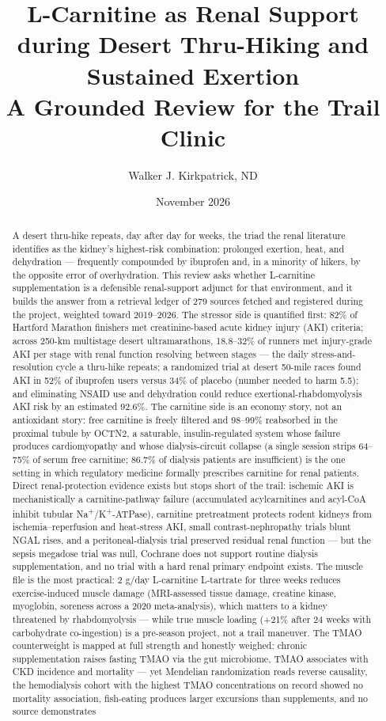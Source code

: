 \documentclass[11pt]{article}
\title{\Large \textbf{L-Carnitine as Renal Support during Desert Thru-Hiking and Sustained Exertion \\ A Grounded Review for the Trail Clinic}}
\author{\normalsize Walker J. Kirkpatrick, ND}
\date{\normalsize November 2026}
\begin{document}
\maketitle

\begin{abstract}
\noindent
A desert thru-hike repeats, day after day for weeks, the triad the renal literature identifies as the kidney's highest-risk combination: prolonged exertion, heat, and dehydration --- frequently compounded by ibuprofen and, in a minority of hikers, by the opposite error of overhydration. This review asks whether L-carnitine supplementation is a defensible renal-support adjunct for that environment, and it builds the answer from a retrieval ledger of 279 sources fetched and registered during the project, weighted toward 2019--2026. The stressor side is quantified first: 82\% of Hartford Marathon finishers met creatinine-based acute kidney injury (AKI) criteria; across 250-km multistage desert ultramarathons, 18.8--32\% of runners met injury-grade AKI per stage with renal function resolving between stages --- the daily stress-and-resolution cycle a thru-hike repeats; a randomized trial at desert 50-mile races found AKI in 52\% of ibuprofen users versus 34\% of placebo (number needed to harm 5.5); and eliminating NSAID use and dehydration could reduce exertional-rhabdomyolysis AKI risk by an estimated 92.6\%. The carnitine side is an economy story, not an antioxidant story: free carnitine is freely filtered and 98--99\% reabsorbed in the proximal tubule by OCTN2, a saturable, insulin-regulated system whose failure produces cardiomyopathy and whose dialysis-circuit collapse (a single session strips 64--75\% of serum free carnitine; 86.7\% of dialysis patients are insufficient) is the one setting in which regulatory medicine formally prescribes carnitine for renal patients. Direct renal-protection evidence exists but stops short of the trail: ischemic AKI is mechanistically a carnitine-pathway failure (accumulated acylcarnitines and acyl-CoA inhibit tubular Na\textsuperscript{+}/K\textsuperscript{+}-ATPase), carnitine pretreatment protects rodent kidneys from ischemia--reperfusion and heat-stress AKI, small contrast-nephropathy trials blunt NGAL rises, and a peritoneal-dialysis trial preserved residual renal function --- but the sepsis megadose trial was null, Cochrane does not support routine dialysis supplementation, and no trial with a hard renal primary endpoint exists. The muscle file is the most practical: 2 g/day L-carnitine L-tartrate for three weeks reduces exercise-induced muscle damage (MRI-assessed tissue damage, creatine kinase, myoglobin, soreness across a 2020 meta-analysis), which matters to a kidney threatened by rhabdomyolysis --- while true muscle loading (+21\% after 24 weeks with carbohydrate co-ingestion) is a pre-season project, not a trail maneuver. The TMAO counterweight is mapped at full strength and honestly weighed: chronic supplementation raises fasting TMAO via the gut microbiome, TMAO associates with CKD incidence and mortality --- yet Mendelian randomization reads reverse causality, the hemodialysis cohort with the highest TMAO concentrations on record showed no mortality association, fish-eating produces larger excursions than supplements, and no source demonstrates 
\end{abstract}
\end{document}
